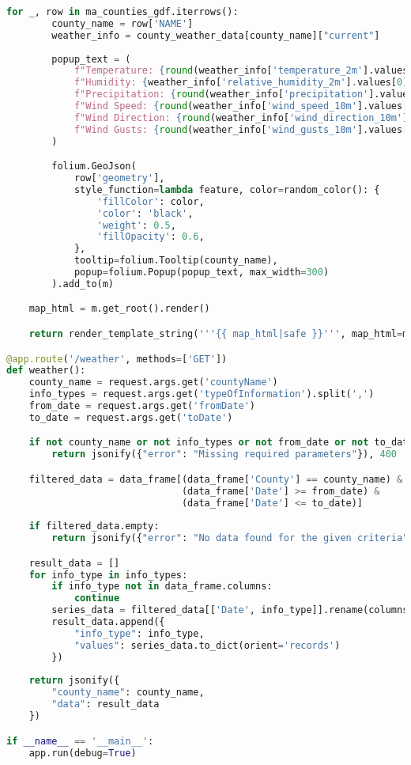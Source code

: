 \documentclass[a4paper, 12pt]{article}
\begin{document}
\begin{lstlisting}[language=Python, caption=Web Server code]
    for _, row in ma_counties_gdf.iterrows():
        county_name = row['NAME']
        weather_info = county_weather_data[county_name]["current"]
        
        popup_text = (
            f"Temperature: {round(weather_info['temperature_2m'].values[0])}°F<br>"
            f"Humidity: {weather_info['relative_humidity_2m'].values[0]}%<br>"
            f"Precipitation: {round(weather_info['precipitation'].values[0], 2)} in<br>"
            f"Wind Speed: {round(weather_info['wind_speed_10m'].values[0], 2)} mph<br>"
            f"Wind Direction: {round(weather_info['wind_direction_10m'].values[0], 2)}°<br>"
            f"Wind Gusts: {round(weather_info['wind_gusts_10m'].values[0], 2)} mph"
        )

        folium.GeoJson(
            row['geometry'],
            style_function=lambda feature, color=random_color(): {
                'fillColor': color,
                'color': 'black',
                'weight': 0.5,
                'fillOpacity': 0.6,
            },
            tooltip=folium.Tooltip(county_name),
            popup=folium.Popup(popup_text, max_width=300)
        ).add_to(m)

    map_html = m.get_root().render()

    return render_template_string('''{{ map_html|safe }}''', map_html=map_html)

@app.route('/weather', methods=['GET'])
def weather():
    county_name = request.args.get('countyName')
    info_types = request.args.get('typeOfInformation').split(',')
    from_date = request.args.get('fromDate')
    to_date = request.args.get('toDate')

    if not county_name or not info_types or not from_date or not to_date:
        return jsonify({"error": "Missing required parameters"}), 400

    filtered_data = data_frame[(data_frame['County'] == county_name) & 
                               (data_frame['Date'] >= from_date) & 
                               (data_frame['Date'] <= to_date)]
    
    if filtered_data.empty:
        return jsonify({"error": "No data found for the given criteria"}), 404

    result_data = []
    for info_type in info_types:
        if info_type not in data_frame.columns:
            continue
        series_data = filtered_data[['Date', info_type]].rename(columns={info_type: 'value'}).dropna()
        result_data.append({
            "info_type": info_type,
            "values": series_data.to_dict(orient='records')
        })
        
    return jsonify({
        "county_name": county_name,
        "data": result_data
    })

if __name__ == '__main__':
    app.run(debug=True)

\end{lstlisting}
\end{document}
